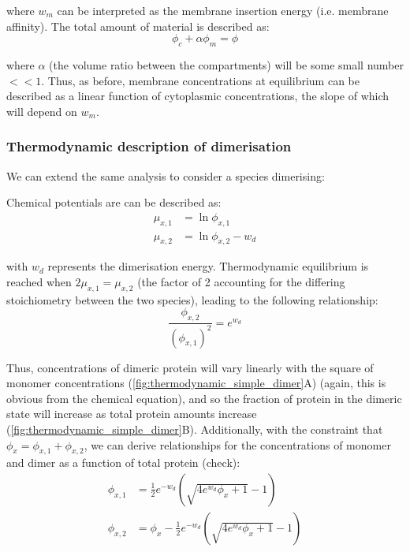 \documentclass[12pt]{"article"}
\begin{document}
where $w_m$ can be interpreted as the membrane insertion energy (i.e. membrane affinity). The total amount of material is described as:
\begin{equation}
\phi_c + \alpha\phi_m = \phi
\end{equation}

where $\alpha$ (the volume ratio between the compartments) will be some small number $<<1$. Thus, as before, membrane concentrations at equilibrium can be described as a linear function of cytoplasmic concentrations, the slope of which will depend on $w_m$.\\

\subsubsection{Thermodynamic description of dimerisation}

We can extend the same analysis to consider a species dimerising:

\begin{center}
\end{center}

Chemical potentials are can be described as:
\begin{align}
\mu_{x,1} &= \ln\phi_{x,1}\\
\mu_{x,2} &= \ln\phi_{x,2} - w_d
\end{align} 

with $w_d$ represents the dimerisation energy. Thermodynamic equilibrium is reached when $2\mu_{x,1} = \mu_{x,2}$ (the factor of 2 accounting for the differing stoichiometry between the two species), leading to the following relationship:
\begin{equation}
\frac{\phi_{x,2}}{(\phi_{x,1})^2} = e^{w_d}
\end{equation}

Thus, concentrations of dimeric protein will vary linearly with the square of monomer concentrations (\cref{fig:thermodynamic_simple_dimer}A) (again, this is obvious from the chemical equation), and so the fraction of protein in the dimeric state will increase as total protein amounts increase (\cref{fig:thermodynamic_simple_dimer}B). Additionally, with the constraint that $\phi_x = \phi_{x,1} + \phi_{x,2}$, we can derive relationships for the concentrations of monomer and dimer as a function of total protein (check):
\begin{align}
\phi_{x,1} &= \frac{1}{2}e^{-w_d}\left(\sqrt{4e^{w_d}\phi_x + 1} - 1\right)\\
\phi_{x,2} &= \phi_x - \frac{1}{2}e^{-w_d}\left(\sqrt{4e^{w_d}\phi_x + 1} - 1\right)
\end{align}
\end{document}
